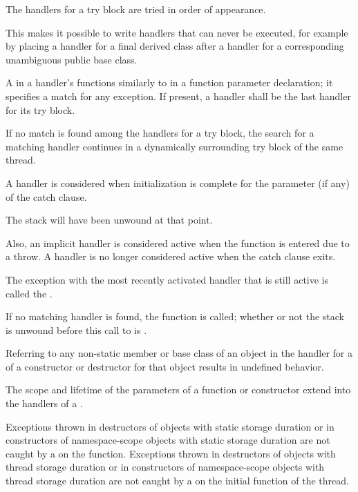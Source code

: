 \pnum
The handlers for a try block are tried in order of appearance.
\begin{note}
This makes it possible to write handlers that can never be
executed, for example by placing a handler for a final derived class after
a handler for a corresponding unambiguous public base class.
\end{note}

\pnum
A
in a handler's
functions similarly to
in a function parameter declaration;
it specifies a match for any exception.
If present, a
handler shall be the last handler for its try block.

\pnum
If no match is found among the handlers for a try block,
the search for a matching
handler continues in a dynamically surrounding try block
of the same thread.

\pnum
A handler is considered  when
initialization is complete for the parameter (if any) of the catch clause.
\begin{note}
The stack will have been unwound at that point.
\end{note}
Also, an implicit handler is considered active when
the function 
is entered due to a throw. A handler is no longer considered active when the
catch clause exits.

\pnum
{}%
The exception with the most recently activated handler that is
still active is called the
.

\pnum
If no matching handler is found,
the function
is called;
whether or not the stack is unwound before this call to
is .

\pnum
Referring to any non-static member or base class of an object
in the handler for a
of a constructor or destructor for that object results in undefined behavior.

\pnum
The scope and lifetime of the parameters of a function or constructor
extend into the handlers of a
.

\pnum
Exceptions thrown in destructors of objects with static storage duration or in
constructors of namespace-scope objects with static storage duration are not caught by a
on
the  function.
Exceptions thrown in destructors of objects with thread storage duration or in constructors of namespace-scope objects with thread storage duration are not caught by a
on the initial function of the thread.

